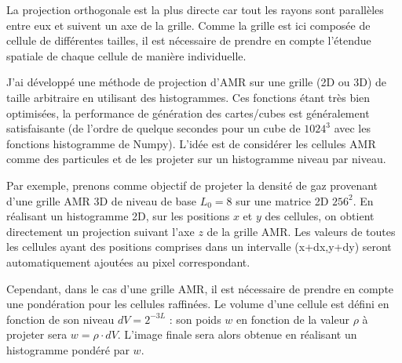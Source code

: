 La projection orthogonale est la plus directe car tout les rayons sont parallèles entre eux et suivent un axe de la grille.
Comme la grille est ici composée de cellule de différentes tailles, il est nécessaire de prendre en compte l'étendue spatiale de chaque cellule de manière individuelle.

J'ai développé une méthode de projection d'\ac{AMR} sur une grille (2D ou 3D) de taille arbitraire en utilisant des histogrammes.
Ces fonctions étant très bien optimisées, la performance de génération des cartes/cubes est généralement satisfaisante (de l'ordre de quelque secondes pour un cube de $1024^3$ avec les fonctions histogramme de Numpy).
L'idée est de considérer les cellules \ac{AMR} comme des particules et de les projeter sur un histogramme niveau par niveau.


Par exemple, prenons comme objectif de projeter la densité de gaz provenant d'une grille \ac{AMR} 3D de niveau de base $L_{0}=8$ sur une matrice 2D $256^2$.
En réalisant un histogramme 2D, sur les positions $x$ et $y$ des cellules, on obtient directement un projection suivant l'axe $z$ de la grille \ac{AMR}.
Les valeurs de toutes les cellules ayant des positions comprises dans un intervalle (x+dx,y+dy) seront automatiquement ajoutées au pixel correspondant.

Cependant, dans le cas d'une grille \ac{AMR}, il est nécessaire de prendre en compte une pondération pour les cellules raffinées.
Le volume d'une cellule est défini en fonction de son niveau $dV= 2^{-3L}$ : son poids $w$ en fonction de la valeur $\rho$ à projeter sera $w = \rho \cdot dV$.
L'image finale sera alors obtenue en réalisant un histogramme pondéré par $w$.





